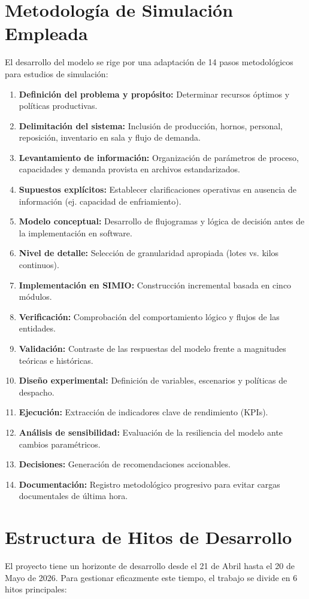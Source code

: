 \documentclass[11pt,letterpaper]{article}
\begin{document}
\section{Metodología de Simulación Empleada}
El desarrollo del modelo se rige por una adaptación de 14 pasos metodológicos para estudios de simulación:
\begin{enumerate}
    \item \textbf{Definición del problema y propósito:} Determinar recursos óptimos y políticas productivas.
    \item \textbf{Delimitación del sistema:} Inclusión de producción, hornos, personal, reposición, inventario en sala y flujo de demanda.
    \item \textbf{Levantamiento de información:} Organización de parámetros de proceso, capacidades y demanda provista en archivos estandarizados.
    \item \textbf{Supuestos explícitos:} Establecer clarificaciones operativas en ausencia de información (ej. capacidad de enfriamiento).
    \item \textbf{Modelo conceptual:} Desarrollo de flujogramas y lógica de decisión antes de la implementación en software.
    \item \textbf{Nivel de detalle:} Selección de granularidad apropiada (lotes vs. kilos continuos).
    \item \textbf{Implementación en SIMIO:} Construcción incremental basada en cinco módulos.
    \item \textbf{Verificación:} Comprobación del comportamiento lógico y flujos de las entidades.
    \item \textbf{Validación:} Contraste de las respuestas del modelo frente a magnitudes teóricas e históricas.
    \item \textbf{Diseño experimental:} Definición de variables, escenarios y políticas de despacho.
    \item \textbf{Ejecución:} Extracción de indicadores clave de rendimiento (KPIs).
    \item \textbf{Análisis de sensibilidad:} Evaluación de la resiliencia del modelo ante cambios paramétricos.
    \item \textbf{Decisiones:} Generación de recomendaciones accionables.
    \item \textbf{Documentación:} Registro metodológico progresivo para evitar cargas documentales de última hora.
\end{enumerate}

\section{Estructura de Hitos de Desarrollo}
El proyecto tiene un horizonte de desarrollo desde el 21 de Abril hasta el 20 de Mayo de 2026. Para gestionar eficazmente este tiempo, el trabajo se divide en 6 hitos principales:
\end{document}
